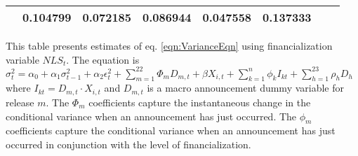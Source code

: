 \begin{sidewaystable}
{\begin{tabular}{@{}lllllllllllll@{}}
                                            & \multicolumn{2}{c}{ 0.104799 }                                                 & \multicolumn{2}{c}{ 0.072185 }                                                 & \multicolumn{2}{c}{ 0.086944 }                                                 & \multicolumn{2}{c}{ 0.047558 }                                                   & \multicolumn{2}{c}{ 0.137333 }                                                 \\ \bottomrule 
\end{tabular}
}
\begin{tablenotes}\item 
        \singlespacing
        \footnotesize
        This table presents estimates of eq. \ref{eqn:VarianceEqn} using financialization variable $NLS_t$. The equation is $\sigma_{t}^2=\alpha_0+\alpha_1 \sigma_{t-1}^2+\alpha_2 \epsilon_t^2 +\sum_{m=1}^{22} \Phi_m D_{m,t}+\beta X_{i,t}+\sum_{k=1}^n \phi_k I_{kt} + \sum_{h=1}^{23} \rho_h D_h$ where $I_{kt}=D_{m,t} \cdot X_{i,t}$ and $D_{m,t}$ is a macro announcement dummy variable for release $m$. The $\Phi_m$ coefficients capture the instantaneous change in the conditional variance when an announcement has just occurred. The $\phi_m$ coefficients capture the conditional variance when an announcement has just occurred in conjunction with the level of financialization.
\end{tablenotes}
\end{sidewaystable}

